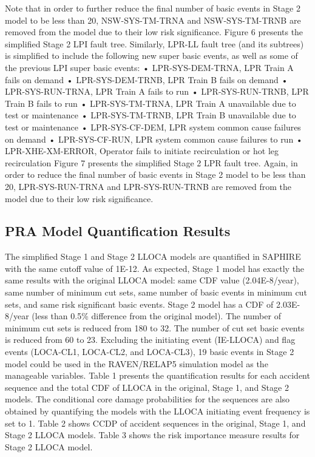Note that in order to further reduce the final number of basic events in Stage 2 model to be less than 20, NSW-SYS-TM-TRNA and NSW-SYS-TM-TRNB are removed from the model due to their low risk significance. Figure 6 presents the simplified Stage 2 LPI fault tree. 
Similarly, LPR-LL fault tree (and its subtrees) is simplified to include the following new super basic events, as well as some of the previous LPI super basic events: 
•	LPR-SYS-DEM-TRNA, LPR Train A fails on demand 
•	LPR-SYS-DEM-TRNB, LPR Train B fails on demand
•	LPR-SYS-RUN-TRNA, LPR Train A fails to run
•	LPR-SYS-RUN-TRNB, LPR Train B fails to run
•	LPR-SYS-TM-TRNA, LPR Train A unavailable due to test or maintenance
•	LPR-SYS-TM-TRNB, LPR Train B unavailable due to test or maintenance
•	LPR-SYS-CF-DEM, LPR system common cause failures on demand 
•	LPR-SYS-CF-RUN, LPR system common cause failures to run
•	LPR-XHE-XM-ERROR, Operator fails to initiate recirculation or hot leg recirculation
Figure 7 presents the simplified Stage 2 LPR fault tree. Again, in order to reduce the final number of basic events in Stage 2 model to be less than 20, LPR-SYS-RUN-TRNA and LPR-SYS-RUN-TRNB are removed from the model due to their low risk significance.

\subsection{PRA Model Quantification Results}

The simplified Stage 1 and Stage 2 LLOCA models are quantified in SAPHIRE with the same cutoff value of 1E-12. As expected, Stage 1 model has exactly the same results with the original LLOCA model: same CDF value (2.04E-8/year), same number of minimum cut sets, same number of basic events in minimum cut sets, and same risk significant basic events.
Stage 2 model has a CDF of 2.03E-8/year (less than 0.5\% difference from the original model). The number of minimum cut sets is reduced from 180 to 32. The number of cut set basic events is reduced from 60 to 23. Excluding the initiating event (IE-LLOCA) and flag events (LOCA-CL1, LOCA-CL2, and LOCA-CL3), 19 basic events in Stage 2 model could be used in the RAVEN/RELAP5 simulation model as the manageable variables. Table 1 presents the quantification results for each accident sequence and the total CDF of LLOCA in the original, Stage 1, and Stage 2 models. The conditional core damage probabilities for the sequences are also obtained by quantifying the models with the LLOCA initiating event frequency is set to 1. Table 2 shows CCDP of accident sequences in the original, Stage 1, and Stage 2 LLOCA models. Table 3 shows the risk importance measure results for Stage 2 LLOCA model. 

